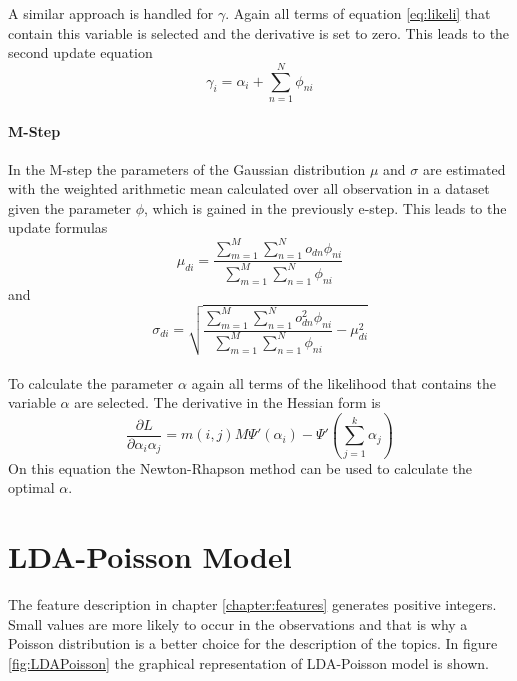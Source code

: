 A similar approach is handled for $\gamma$. Again all terms of equation \ref{eq:likeli} that contain this variable is selected and the derivative is set to zero. This leads to the second update equation
\begin{equation}
 \gamma_i = \alpha_i + \sum_{n=1}^N \phi_{ni}
\end{equation}


  \paragraph{M-Step}
  
In the M-step the parameters of the Gaussian distribution $\mu$ and $\sigma$ are estimated with the weighted arithmetic mean calculated over all observation in a dataset given the parameter $\phi$, which is gained in the previously e-step. This leads to the update formulas
\begin{equation}
 \mu_{di} = \frac{\sum_{m=1}^M \sum_{n=1}^N o_{dn} \phi_{ni} }{\sum_{m=1}^M \sum_{n=1}^N  \phi_{ni}}
\end{equation}
and
\begin{equation}
 \sigma_{di} = \sqrt{\frac{\sum_{m=1}^M \sum_{n=1}^N o_{dn}^2 \phi_{ni} }{\sum_{m=1}^M \sum_{n=1}^N  \phi_{ni}} - \mu_{di}^2}
\end{equation}\\

To calculate the parameter $\alpha$ again all terms of the likelihood that contains the variable $\alpha$ are selected. The derivative in the Hessian form is
\begin{equation}
 \frac{\partial L}{\partial \alpha_i\alpha_j} =  m(i,j) M \Psi'(\alpha_i) - \Psi'(\sum_{j=1}^k \alpha_j)
\end{equation}
On this equation the Newton-Rhapson method can be used to calculate the optimal $\alpha$.

\section{LDA-Poisson Model}

The feature description in chapter \ref{chapter:features} generates positive integers. Small values are more likely to occur in the observations and that is why a Poisson distribution is a better choice for the description of the topics. In figure \ref{fig:LDAPoisson} the graphical representation of LDA-Poisson model is shown. 

